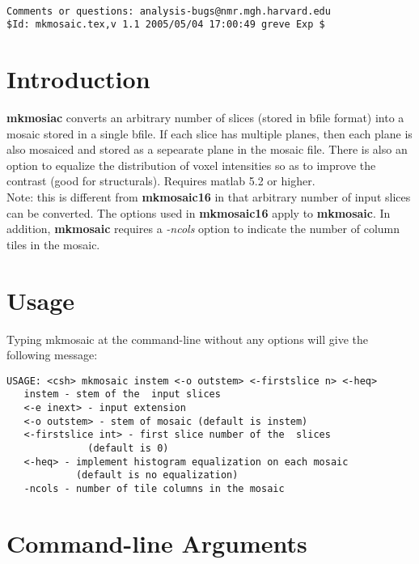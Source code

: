 \documentclass[10pt]{article}
\begin{document}
\begin{Large}
 \\
\end{Large}

\noindent 
\begin{verbatim}
Comments or questions: analysis-bugs@nmr.mgh.harvard.edu
$Id: mkmosaic.tex,v 1.1 2005/05/04 17:00:49 greve Exp $
\end{verbatim}

\section{Introduction}
{\bf mkmosiac} converts an arbitrary number of slices (stored in bfile
format) into a mosaic stored in a single bfile.  If each slice has
multiple planes, then each plane is also mosaiced and stored as a
sepearate plane in the mosaic file.  There is also an option to
equalize the distribution of voxel intensities so as to improve the
contrast (good for structurals). Requires matlab 5.2 or higher.\\

Note: this is different from {\bf mkmosaic16} in that arbitrary number
of input slices can be converted.  The options used in {\bf
mkmosaic16} apply to {\bf mkmosaic}.  In addition, {\bf mkmosaic}
requires a {\em -ncols} option to indicate the number of column tiles
in the mosaic.\\

\section{Usage}
Typing mkmosaic at the command-line without any options will give the
following message:\\ 

\begin{small}
\begin{verbatim}
USAGE: <csh> mkmosaic instem <-o outstem> <-firstslice n> <-heq>
   instem - stem of the  input slices
   <-e inext> - input extension 
   <-o outstem> - stem of mosaic (default is instem)
   <-firstslice int> - first slice number of the  slices 
              (default is 0)
   <-heq> - implement histogram equalization on each mosaic
            (default is no equalization)
   -ncols - number of tile columns in the mosaic
\end{verbatim}
\end{small}

\section{Command-line Arguments}
\end{document}
